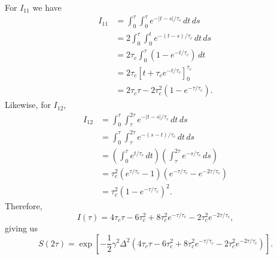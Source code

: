 \documentclass[12pt,reqno]{amsart}
\theoremstyle{plain}
\begin{document}
For $I_{11}$ we have
\begin{align*}
    I_{11} &= \int_{0}^{\tau}\int_{0}^{\tau} e^{-\lvert t-s \rvert/\tau_c}\, dt\,ds\\
    &= 2\int_{0}^{\tau}\int_{0}^{t} e^{-(t-s)/\tau_c}\,dt\,ds\\
    &= 2\tau_c\int_{0}^{\tau} \left(1-e^{-t/\tau_c}\right)\,dt\\
    &= 2\tau_c \left[ t + \tau_c e^{-t/\tau_c}\right]_0^{\tau_c}\\
    &= 2\tau_c\tau -2\tau_c^2\left(1-e^{-\tau/\tau_c}\right).
\end{align*}
Likewise, for $I_{12}$,
\begin{align*}
    I_{12} &= \int_{0}^{\tau}\int_{\tau}^{2\tau} e^{-\lvert t-s \rvert/\tau_c}\, dt\,ds\\
    &= \int_{0}^{\tau}\int_{\tau}^{2\tau} e^{-(s-t)/\tau_c}\, dt\,ds\\
    &= \left( \int_{0}^{\tau} e^{t/\tau_c}\,dt\right) \left( \int_{\tau}^{2\tau}e^{-s/\tau_c}\,ds\right)\\
    &= \tau_c^2 \left( e^{\tau/\tau_c} - 1\right) \left( e^{-\tau/\tau_c} - e^{-2\tau/\tau_c}\right)\\
    &= \tau_c^2 \left(1-e^{-\tau/\tau_c}\right)^2.
\end{align*}
Therefore,
\begin{equation*}
    I(\tau) = 4\tau_c\tau - 6\tau_c^2 + 8\tau_c^2 e^{-\tau/\tau_c} - 2\tau_c^2 e^{-2\tau/\tau_c},
\end{equation*}
giving us
\begin{equation*}
    \boxed{S(2\tau) = \exp{\left[ -\frac{1}{2}\gamma^2\Delta^2 \left(4\tau_c\tau - 6\tau_c^2 + 8\tau_c^2 e^{-\tau/\tau_c} - 2\tau_c^2 e^{-2\tau/\tau_c}\right) \right]}}.
\end{equation*}
\end{document}
